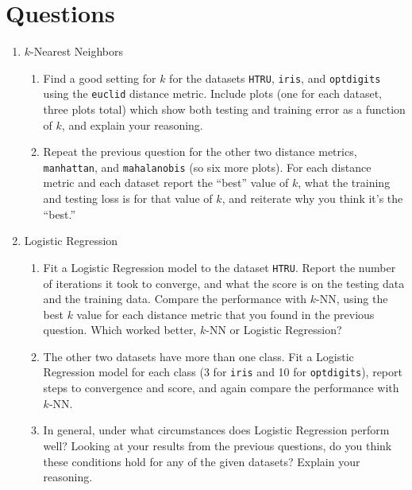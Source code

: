\documentclass{article}
\begin{document}
\section*{Questions}
\begin{enumerate}
	\item \(k\)-Nearest Neighbors
	\begin{enumerate}
		\item Find a good setting for \(k\) for the datasets \texttt{HTRU}, \texttt{iris}, and \texttt{optdigits} using the \texttt{euclid} distance metric. Include plots (one for each dataset, three plots total) which show both testing and training error as a function of \(k\), and explain your reasoning.
		\item Repeat the previous question for the other two distance metrics, \texttt{manhattan}, and \texttt{mahalanobis}
		(so six more plots). For each distance metric and each dataset report the ``best'' value of \(k\), what the training and testing loss is for that value of \(k\), and reiterate why you think it's the ``best.'' 
	\end{enumerate}
	\item Logistic Regression
	\begin{enumerate}
		\item Fit a Logistic Regression model to the dataset \texttt{HTRU}. Report the number of iterations it took to converge, and what the score is on the testing data and the training data. Compare the performance with \(k\)-NN, using the best \(k\) value for each distance metric that you found in the previous question. Which worked better, \(k\)-NN or Logistic Regression?
		
		\item The other two datasets have more than one class. Fit a Logistic Regression model for each class (3 for \texttt{iris} and 10 for \texttt{optdigits}), report steps to convergence and score, and again compare the performance with \(k\)-NN.

		\item In general, under what circumstances does Logistic Regression perform well? Looking at your results from the previous questions, do you think these conditions hold for any of the given datasets? Explain your reasoning.


\end{enumerate}
\end{enumerate}
\end{document}
